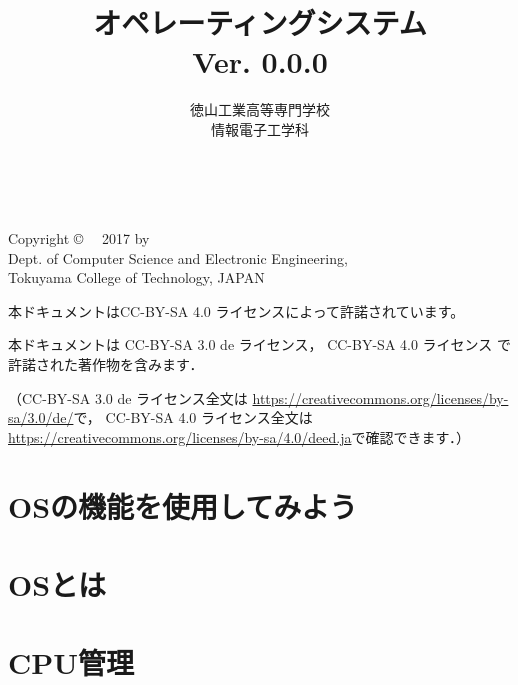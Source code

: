 \documentclass[a4paper,11pt,twocolumn]{ltjsbook}     %
\begin{document}
\frontmatter
\title{オペレーティングシステム\\Ver. 0.0.0}
\author{徳山工業高等専門学校\\情報電子工学科}
\date{}
\maketitle

\thispagestyle{empty}
\onecolumn
~
\vfill
\begin{flushleft}
Copyright \copyright ~~ 2017 by \\
Dept. of Computer Science and Electronic Engineering, \\
Tokuyama College of Technology, JAPAN
\end{flushleft}

\vspace{0.8cm}
本ドキュメントはCC-BY-SA 4.0 ライセンスによって許諾されています。

本ドキュメントは
CC-BY-SA 3.0 de ライセンス，
CC-BY-SA 4.0 ライセンス
で許諾された著作物を含みます．

（CC-BY-SA 3.0 de ライセンス全文は
\url{https://creativecommons.org/licenses/by-sa/3.0/de/}で，
CC-BY-SA 4.0 ライセンス全文は
\url{https://creativecommons.org/licenses/by-sa/4.0/deed.ja}で確認できます．）

\setcounter{tocdepth}{2}
\tableofcontents

\mainmatter

\part{OSの機能を使用してみよう}

\part{OSとは}

\part{CPU管理}
\end{document}
